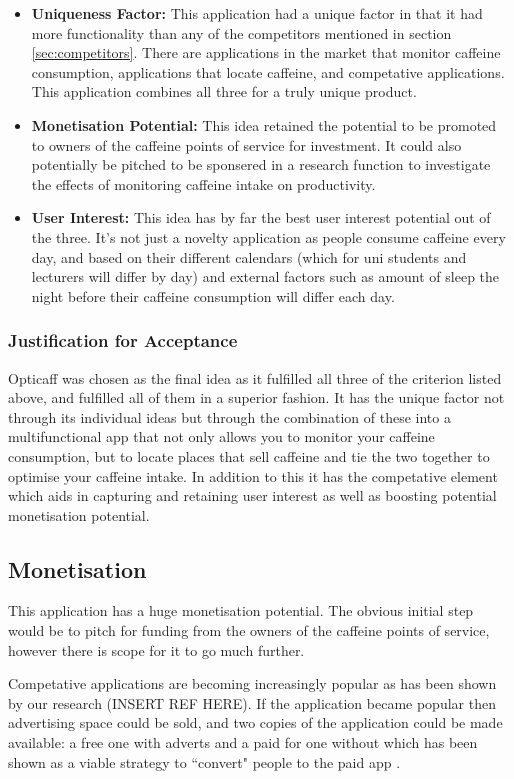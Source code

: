 \begin{itemize}
	\item{\textbf{Uniqueness Factor:} This application had a unique factor in that it had more functionality than any of the competitors mentioned in section \ref{sec:competitors}}. There are applications in the market that monitor caffeine consumption, applications that locate caffeine, and competative applications. This application combines all three for a truly unique product. 
	\item{\textbf{Monetisation Potential:} This idea retained the potential to be promoted to owners of the caffeine points of service for investment. It could also potentially be pitched to be sponsered in a research function to investigate the effects of monitoring caffeine intake on productivity.}
	\item{\textbf{User Interest:} This idea has by far the best user interest potential out of the three. It's not just a novelty application as people consume caffeine every day, and based on their different calendars (which for uni students and lecturers will differ by day) and external factors such as amount of sleep the night before their caffeine consumption will differ each day. }
\end{itemize}

\subsubsection{Justification for Acceptance}
Opticaff was chosen as the final idea as it fulfilled all three of the criterion listed above, and fulfilled all of them in a superior fashion. It has the unique factor not through its individual ideas but through the combination of these into a multifunctional app that not only allows you to monitor your caffeine consumption, but to locate places that sell caffeine and tie the two together to optimise your caffeine intake. In addition to this it has the competative element which aids in capturing and retaining user interest as well as boosting potential monetisation potential. 

\subsection{Monetisation}
This application has a huge monetisation potential. The obvious initial step would be to pitch for funding from the owners of the caffeine points of service, however there is scope for it to go much further. 

Competative applications are becoming increasingly popular as has been shown by our research (INSERT REF HERE). If the application became popular then advertising space could be sold, and two copies of the application could be made available: a free one with adverts and a paid for one without which has been shown as a viable strategy to ``convert" people to the paid app \cite{adverts} \cite{drawsomething}.